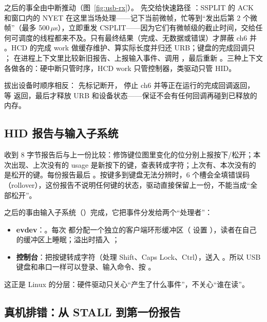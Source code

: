 之后的事全由中断推动（图~\ref{fig:usb-rx}）。 先交给快速路径 ：SSPLIT 的 ACK 和窗口内的 NYET 在这里当场处理——记下当前微帧，忙等到“发出后第 2 个微帧”（最多 500\,$\mu$s），立即重发 CSPLIT——因为它们有微帧级的截止时间，交给任何可调度的线程都来不及。只有最终结果（完成、无数据或错误）才屏蔽 ch6 并 。HCD 的完成 work 做缓存维护、算实际长度并归还 URB；键盘的完成回调只 ； 在进程上下文里比较新旧报告、上报输入事件、调用 ，最后重新 。三种上下文各做各的：硬中断只管时序，HCD work 只管控制器，类驱动只管 HID。

拔出设备时顺序相反： 先标记断开， 停止 ch6 并等正在运行的完成回调返回， 等  返回，最后才释放 URB 和设备状态——保证不会有任何回调再碰到已释放的内存。

\subsection{HID 报告与输入子系统}

 收到 8 字节报告后与上一份比较：修饰键位图里变化的位分别上报按下/松开；本次出现、上次没有的 usage 是新按下的键，查表转成字符；上次有、本次没有的是松开的键。每份报告最后 。按键多到键盘无法分辨时，6 个槽会全填错误码（rollover），这份报告不说明任何键的状态，驱动直接保留上一份，不能当成“全部松开”。

之后的事由输入子系统（）完成，它把事件分发给两个“处理者”：

\begin{itemize}
  \item \textbf{evdev}：。每次  都分配一个独立的客户端环形缓冲区（ 设置 ），读者在自己的缓冲区上睡眠；溢出时插入 ；
  \item \textbf{控制台}：把按键转成字符（处理 Shift、Caps Lock、Ctrl），送入 。所以 USB 键盘和串口一样可以登录、输入命令、按 。
\end{itemize}

这正是 Linux 的分层：硬件驱动只关心“产生了什么事件”，不关心“谁在读”。

\subsection{真机排错：从 STALL 到第一份报告}
\label{sec:usb-debug}

